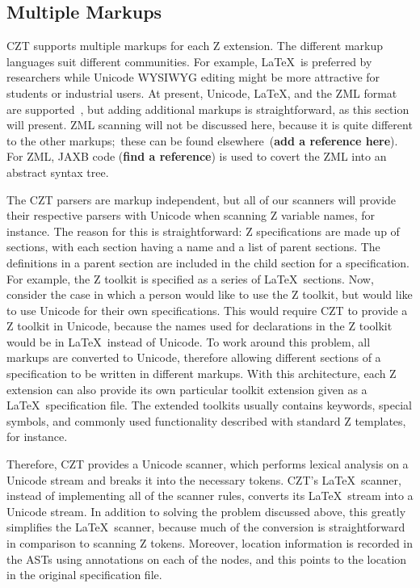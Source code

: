 \documentclass{llncs}
\begin{document}
\subsection{Multiple Markups}\label{multiple-markups}

 CZT supports multiple markups for each Z extension.  The different
 markup languages suit different communities.  For example, \LaTeX\
 is preferred by researchers while Unicode WYSIWYG editing might be
 more attractive for students or industrial users. At present,
 Unicode, \LaTeX, and the ZML format are supported~\cite{UttEA:03},
 but adding additional markups is straightforward, as this section
 will present.  ZML scanning will not be discussed here, because it is
 quite different to the other markups;~these can be found elsewhere~({\bf add a reference here}).
 For ZML, JAXB code ({\bf find a reference}) is used to covert the ZML into an abstract syntax tree.

The CZT parsers are markup independent, but all of our scanners will
provide their respective parsers with Unicode when scanning Z variable
names, for instance. The reason for this is straightforward: Z specifications
are made up of sections, with each section having a name and a list of
parent sections. The definitions in a parent section are included in
the child section for a specification. For example, the Z toolkit is
specified as a series of \LaTeX\ sections. Now, consider the case in
which a person would like to use the Z toolkit, but would like to use
Unicode for their own specifications. This would require CZT to
provide a Z toolkit in Unicode, because the names used for
declarations in the Z toolkit would be in \LaTeX~instead of
Unicode. To work around this problem, all markups are converted to
Unicode, therefore allowing different sections of a specification to
be written in different markups.
With this architecture, each Z extension can also provide its own
particular toolkit extension given as a \LaTeX\ specification file.
The extended toolkits usually contains keywords, special symbols,
and commonly used functionality described with standard Z templates, for instance.

Therefore, CZT provides a Unicode scanner, which performs lexical
analysis on a Unicode stream and breaks it into the necessary
tokens. CZT's \LaTeX~scanner, instead of implementing all of the
scanner rules, converts its \LaTeX~stream into a Unicode stream. In
addition to solving the problem discussed above, this greatly
simplifies the \LaTeX~scanner, because much of the conversion is
straightforward in comparison to scanning Z tokens. Moreover, location
information is recorded in the ASTs using annotations on each of the
nodes, and this points to the location in the original specification file.
\end{document}
